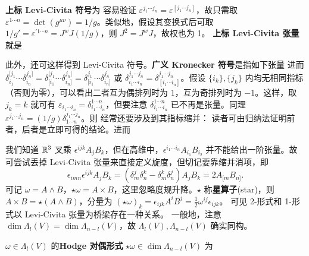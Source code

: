 \textbf{上标 Levi-Civita 符号}为
容易验证 $\varepsilon^{j_1\cdots j_n}=\varepsilon^{[j_1\cdots j_n]}$，故只需取 $\varepsilon^{1\cdots n}=\det(g^{\mu\nu})=1/g$。类似地，假设其变换式后可取 $1/g'=\varepsilon^{\prime 1\cdots n}=J^w J(1/g)$，则 $J^2=J^w J$，故权也为 1。
\textbf{上标 Levi-Civita 张量}就是

此外，还可这样得到 Levi-Civita 符号。\textbf{广义 Kronecker 符号}是指如下张量
进而 $\delta_{i_1}^{[j_1}\cdots\delta_{i_n}^{j_n]}=\delta_{[i_1}^{[j_1}\cdots\delta_{i_n]}^{j_n]}=\delta_{[i_1}^{j_1}\cdots\delta_{i_n]}^{j_n}$ 或 $\delta_{i_1\cdots i_n}^{j_1\cdots j_n}=\delta_{[i_1\cdots i_n]}^{j_1\cdots j_n}$。假设 $\{i_k\},\{j_k\}$ 内均无相同指标（否则为零），可以看出二者互为偶排列时为 $1$，互为奇排列时为 $-1$。这样，取 $j_k=k$ 就可有 $\varepsilon_{i_1\cdots i_n}=\delta_{i_1\cdots i_n}^{1\cdots n}$，但要注意 $\delta_{i_1\cdots i_n}^{1\cdots n}$ 已不再是张量。同理 $\varepsilon^{j_1\cdots j_n}=(1/g)\delta^{j_1\cdots j_n}_{1\cdots n}$。则
经常还要涉及到其指标缩并：
读者可由归纳法证明前者，后者是立即可得的结论。进而

我们知道 $\mathbb{R}^3$ 叉乘 $\epsilon^{ijk} A_j B_k$，但在高维中，$\epsilon^{i_1\cdots i_n} A_{i_1} B_{i_2}$ 并不能给出一阶张量。故可尝试丢掉 Levi-Civita 张量来直接定义旋度，但切记要靠缩并消项，即
\[
    \epsilon_{imn}\epsilon^{ijk} A_j B_k=(\delta^j_m\delta^k_n-\delta^k_m\delta^j_n)A_j B_k=2A_{[m} B_{n]}.
\]
可记 $\omega=A\wedge B$，$\star\omega=A\times B$，这里忽略度规升降。$\star$ 称\textbf{星算子}(star)，则 $A\times B=\star(A\wedge B)$，分量为 $(\star\omega)_k=\epsilon_{ijk} A^{i}B^{j}=\frac{1}{2}\omega^{ij}\epsilon_{ijk}$。
可见 2-形式和 1-形式以 Levi-Civita 张量为桥梁存在一种关系。
一般地，注意 $\dim\Lambda_l(V)=\dim\Lambda_{n-l}(V)$，故 $\Lambda_l(V),\Lambda_{n-l}(V)$ 确实同构。
\begin{definition}
    $\omega\in\Lambda_l(V)$ 的\textbf{Hodge 对偶形式} $\star\omega\in\dim\Lambda_{n-l}(V)$ 为
\end{definition}

